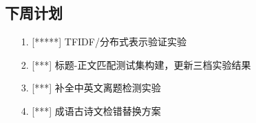 \documentclass[11pt]{article}
\begin{document}
\begin{CJK}{UTF8}{gkai}
\section{下周计划}
\begin{itemize}
\item [1.] [*****] TFIDF/分布式表示验证实验
\item [2.] [***] 标题-正文匹配测试集构建，更新三档实验结果
\item [3.] [***] 补全中英文离题检测实验
\item [4.] [***] 成语古诗文检错替换方案
\end{itemize}
%
%
%

\end{CJK}
\end{document}
